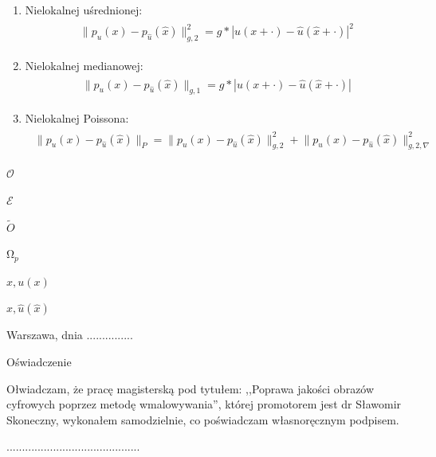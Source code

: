 \documentclass[12pt, twoside, openany]{report}
\theoremstyle{definition}
\begin{document}
\begin{enumerate}
\item
Nielokalnej uśrednionej:
\begin{align}
\begin{aligned}
\big\| p_{u}(x) - p_{\hat{u}}(\hat{x}) \big\|^{2}_{g,2} = g \ast | u(x+\cdot) - \hat{u}(\hat{x}+\cdot) |^2
\label{nonLocalMeans}
\end{aligned}
\end{align}
\item
Nielokalnej medianowej:
\begin{align}
\begin{aligned}
\big\| p_{u}(x) - p_{\hat{u}}(\hat{x}) \big\|_{g,1} = g \ast | u(x+\cdot) - \hat{u}(\hat{x}+\cdot) |
\label{nonLocalMedians}
\end{aligned}
\end{align}
\item
Nielokalnej Poissona:
\begin{align}
\begin{aligned}
\big\| p_{u}(x) - p_{\hat{u}}(\hat{x}) \big\|_{P} = \big\| p_{u}(x) - p_{\hat{u}}(\hat{x}) \big\|^{2}_{g,2} + \big\| p_{u}(x) - p_{\hat{u}}(\hat{x}) \big\|^{2}_{g,2,\nabla}
\label{nonLocalpoisson}
\end{aligned}
\end{align}

\end{enumerate}



$\mathcal{O}$

$\mathcal{E}$

$\widetilde O$

$\mathrm{\Omega }_p$

$x,u(x)$

$\hat{x}, \hat{u}(\hat{x})$

 



 





\newpage



 
\tableofcontents
\clearpage
\pagestyle{empty}
\noindent Warszawa, dnia ...............
\vspace{5cm}
\begin{center}
\LARGE{Oświadczenie}
\end{center}
Ołwiadczam, że pracę magisterską pod tytułem: ,,Poprawa jakości obrazów cyfrowych poprzez metodę wmalowywania'', której promotorem jest dr Sławomir Skoneczny, wykonałem samodzielnie, co poświadczam własnoręcznym podpisem.
\vspace{2cm}
\begin{flushright}
...........................................
\end{flushright}
\end{document}
